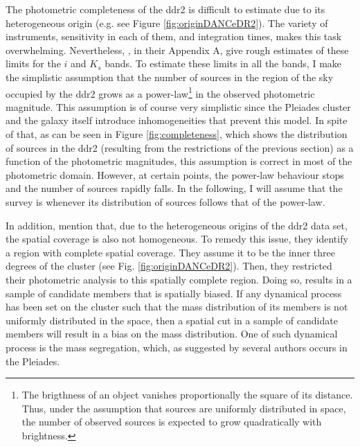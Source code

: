 The photometric completeness of the \gls{ddr2} is difficult to estimate due to its heterogeneous origin (e.g. see Figure \ref{fig:originDANCeDR2}). The variety of instruments, sensitivity in each of them, and integration times, makes this task overwhelming. Nevertheless, \citet{Bouy2015}, in their Appendix A, give rough estimates of these limits for the $i$ and $K_s$ bands. To estimate these limits in all the bands, I make the simplistic assumption that the number of sources in the region of the sky occupied by the \gls{ddr2} grows as a power-law\footnote{The brigthness of an object vanishes proportionally the square of its distance. Thus, under the assumption that sources are uniformly distributed in space, the number of observed sources is expected to grow quadratically with brightness.} in the observed photometric magnitude. This assumption is of course very simplistic since the Pleiades cluster and the galaxy itself introduce inhomogeneities that prevent this model. In spite of that, as can be seen in Figure \ref{fig:completeness}, which shows the distribution of sources in the \gls{ddr2} (resulting from the restrictions of the previous section) as a function of the photometric magnitudes, this assumption is correct in most of the photometric domain. However, at certain points, the power-law behaviour stops and the number of sources rapidly falls. In the following, I will assume that the survey is whenever its distribution of sources follows that of the power-law.

In addition, \citet{Bouy2015} mention that, due to the heterogeneous origins of the \gls{ddr2} data set, the spatial coverage is also not homogeneous. To remedy this issue, they identify a region with complete spatial coverage. They assume it to be the inner three degrees of the cluster (see Fig. \ref{fig:originDANCeDR2}). Then, they restricted their photometric analysis to this spatially complete region. Doing so, results in a sample of candidate members that is spatially biased. If any dynamical process has been set on the cluster such that the mass distribution of its members is not uniformly distributed in the space, then a spatial cut in a sample of candidate members will result in a bias on the mass distribution. One of such dynamical process is the mass segregation, which, as suggested by several authors \cite[][including the present work]{Adams2001,Converse2008,Converse2010} occurs in the Pleiades.

